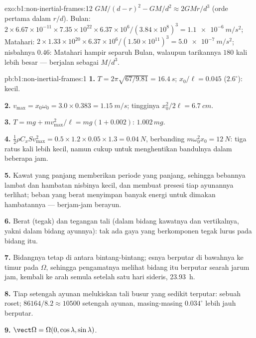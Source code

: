 \begin{solution}{exo:b1:non-inertial-frames:12}
$GM/(d - r)^2 - GM/d^2 \approx 2GMr/d^3$ (orde pertama dalam $r/d$). Bulan:
$2 \times 6.67\times10^{-11} \times 7.35\times10^{22} \times 6.37\times10^6/
(3.84\times10^8)^3 = \qty{1.1e-6}{m/s^2}$; Matahari: $2 \times 1.33\times10^{20}
\times 6.37\times10^6/(1.50\times10^{11})^3 = \qty{5.0e-7}{m/s^2}$; nisbahnya
$0.46$:  Matahari hampir separuh  Bulan, walaupun
tarikannya $180$ kali lebih besar ---  berjalan sebagai $M/d^3$.
\end{solution}

\begin{solution}{pb:b1:non-inertial-frames:1}
\textbf{1.} $T = 2\pi\sqrt{67/9.81} = \qty{16.4}{s}$; $x_0/\ell = 0.045$
($2.6^\circ$): kecil.

\textbf{2.} $v_{\max} = x_0\omega_0 = 3.0 \times 0.383 = \qty{1.15}{m/s}$; tingginya
$x_0^2/2\ell = \qty{6.7}{cm}$.

\textbf{3.} $T = mg + mv_{\max}^2/\ell = mg(1 + 0.002)$: $1.002\,mg$.

\textbf{4.} $\tfrac12\rho C_xSv_{\max}^2 = 0.5 \times 1.2 \times 0.05 \times 1.3 =
\qty{0.04}{N}$, berbanding $m\omega_0^2x_0 = \qty{12}{N}$: tiga ratus kali lebih
kecil, namun cukup untuk menghentikan bandulnya dalam beberapa jam.

\textbf{5.} Kawat yang panjang memberikan periode yang panjang, sehingga bebannya lambat
dan hambatan nisbinya kecil, dan membuat presesi tiap ayunannya terlihat; beban
yang berat menyimpan banyak energi untuk dimakan hambatannya --- berjam-jam berayun.

\textbf{6.} Berat (tegak) dan tegangan tali (dalam bidang kawatnya dan
vertikalnya, yakni dalam bidang ayunnya): tak ada gaya yang berkomponen
tegak lurus pada bidang itu.

\textbf{7.} Bidangnya tetap di antara bintang-bintang; esnya berputar di bawahnya
ke timur pada $\Omega$, sehingga pengamatnya melihat bidang itu berputar searah jarum jam,
kembali ke arah semula setelah satu hari sideris, \qty{23.93}{h}.

\textbf{8.} Tiap setengah ayunan melukiskan tali busur yang sedikit terputar: sebuah roset;
$86164/8.2 \approx 10500$ setengah ayunan, masing-masing $0.034^\circ$ lebih jauh berputar.

\textbf{9.} $\vect\Omega = \Omega(0, \cos\lambda, \sin\lambda)$.


\end{solution}
